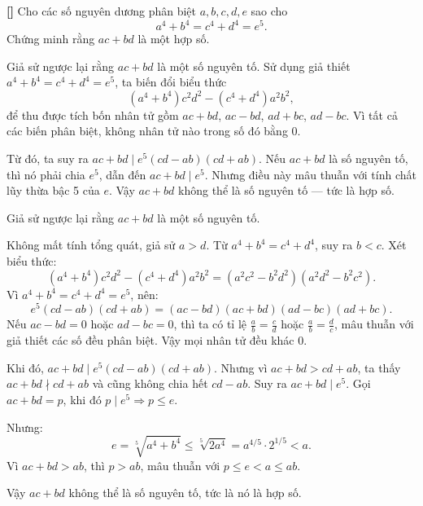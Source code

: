 \documentclass[../04-diophantine-equations.tex]{subfiles}
\begin{document}
\begin{example*}\label{example:USA-2015-MO-P5}\textbf{[]}
	Cho các số nguyên dương phân biệt \( a, b, c, d, e \) sao cho
	\[
		a^4 + b^4 = c^4 + d^4 = e^5.
	\]
	Chứng minh rằng \( ac + bd \) là một hợp số.
\end{example*}

\begin{story*}
	Giả sử ngược lại rằng \( ac + bd \) là một số nguyên tố.  
	Sử dụng giả thiết \( a^4 + b^4 = c^4 + d^4 = e^5 \), ta biến đổi biểu thức
	\[
		(a^4 + b^4)c^2d^2 - (c^4 + d^4)a^2b^2,
	\]
	để thu được tích bốn nhân tử gồm \( ac + bd \), \( ac - bd \), \( ad + bc \), \( ad - bc \).  
	Vì tất cả các biến phân biệt, không nhân tử nào trong số đó bằng 0.

	Từ đó, ta suy ra \( ac + bd \mid e^5(cd - ab)(cd + ab) \). Nếu \( ac + bd \) là số nguyên tố, thì nó phải chia \( e^5 \), dẫn đến \( ac + bd \mid e^5 \).  
	Nhưng điều này mâu thuẫn với tính chất lũy thừa bậc 5 của \( e \). Vậy \( ac + bd \) không thể là số nguyên tố — tức là hợp số.
\end{story*}

\bigbreak

\begin{soln}\footnotemark
	Giả sử ngược lại rằng \(ac + bd\) là một số nguyên tố.

	Không mất tính tổng quát, giả sử \(a > d\). Từ \(a^4 + b^4 = c^4 + d^4\), suy ra \(b < c\).  
	Xét biểu thức:
	\[
		(a^4 + b^4)c^2d^2 - (c^4 + d^4)a^2b^2
		= (a^2c^2 - b^2d^2)(a^2d^2 - b^2c^2).
	\]
	Vì \(a^4 + b^4 = c^4 + d^4 = e^5\), nên:
	\[
		e^5(cd - ab)(cd + ab) 
		= (ac - bd)(ac + bd)(ad - bc)(ad + bc).
	\]
	Nếu \(ac - bd = 0\) hoặc \(ad - bc = 0\), thì ta có tỉ lệ \(\tfrac{a}{b} = \tfrac{c}{d}\) hoặc \(\tfrac{a}{b} = \tfrac{d}{c}\), mâu thuẫn với giả thiết các số đều phân biệt.  
	Vậy mọi nhân tử đều khác 0.

	Khi đó, \( ac + bd \mid e^5(cd - ab)(cd + ab) \).  
	Nhưng vì \( ac + bd > cd + ab \), ta thấy \( ac + bd \nmid cd + ab \) và cũng không chia hết \( cd - ab \).  
	Suy ra \( ac + bd \mid e^5 \). Gọi \( ac + bd = p \), khi đó \( p \mid e^5 \Rightarrow p \le e \).  

	Nhưng:
	\[
		e = \sqrt[5]{a^4 + b^4} \le \sqrt[5]{2a^4} = a^{4/5} \cdot 2^{1/5} < a.
	\]
	Vì \( ac + bd > ab \), thì \( p > ab \), mâu thuẫn với \( p \le e < a \le ab \).  

	Vậy \( ac + bd \) không thể là số nguyên tố, tức là nó là hợp số.
\end{soln}

\end{document}
